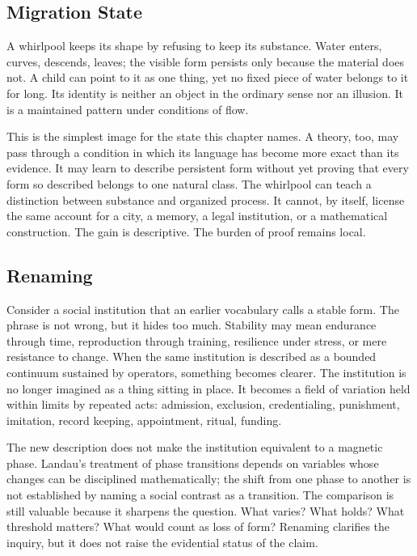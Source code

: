 \documentclass[11pt,a4paper,openany]{book}
\begin{document}
\subsection{Migration State}
A whirlpool keeps its shape by refusing to keep its substance. Water enters, curves, descends, leaves; the visible form persists only because the material does not. A child can point to it as one thing, yet no fixed piece of water belongs to it for long. Its identity is neither an object in the ordinary sense nor an illusion. It is a maintained pattern under conditions of flow. \cite{landau_stat_physics,prigogine_dissipative}\par
This is the simplest image for the state this chapter names. A theory, too, may pass through a condition in which its language has become more exact than its evidence. It may learn to describe persistent form without yet proving that every form so described belongs to one natural class. The whirlpool can teach a distinction between substance and organized process. It cannot, by itself, license the same account for a city, a memory, a legal institution, or a mathematical construction. The gain is descriptive. The burden of proof remains local.\par
\subsection{Renaming}
Consider a social institution that an earlier vocabulary calls a stable form. The phrase is not wrong, but it hides too much. Stability may mean endurance through time, reproduction through training, resilience under stress, or mere resistance to change. When the same institution is described as a bounded continuum sustained by operators, something becomes clearer. The institution is no longer imagined as a thing sitting in place. It becomes a field of variation held within limits by repeated acts: admission, exclusion, credentialing, punishment, imitation, record keeping, appointment, ritual, funding. \cite{landau_stat_physics,prigogine_dissipative}\par
The new description does not make the institution equivalent to a magnetic phase. Landau's treatment of phase transitions depends on variables whose changes can be disciplined mathematically; the shift from one phase to another is not established by naming a social contrast as a transition. The comparison is still valuable because it sharpens the question. What varies? What holds? What threshold matters? What would count as loss of form? Renaming clarifies the inquiry, but it does not raise the evidential status of the claim.\par
\end{document}
